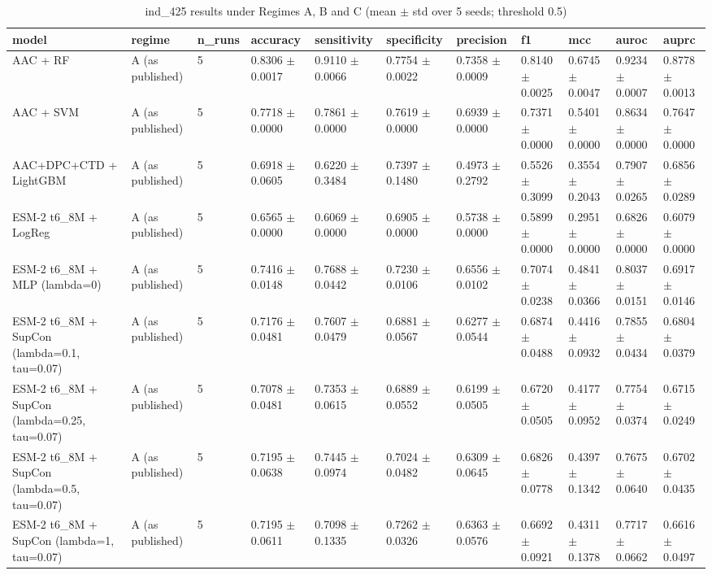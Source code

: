 \begin{table}[ht]
\centering\small
\caption{ind\_425 results under Regimes A, B and C (mean $\pm$ std over 5 seeds; threshold 0.5)}
\label{tab:T5_2_ind425}
\begin{tabular}{lllllllllll}
\hline
model & regime & n\_runs & accuracy & sensitivity & specificity & precision & f1 & mcc & auroc & auprc \\
\hline
AAC + RF & A (as published) & 5 & 0.8306 $\pm$ 0.0017 & 0.9110 $\pm$ 0.0066 & 0.7754 $\pm$ 0.0022 & 0.7358 $\pm$ 0.0009 & 0.8140 $\pm$ 0.0025 & 0.6745 $\pm$ 0.0047 & 0.9234 $\pm$ 0.0007 & 0.8778 $\pm$ 0.0013 \\
AAC + SVM & A (as published) & 5 & 0.7718 $\pm$ 0.0000 & 0.7861 $\pm$ 0.0000 & 0.7619 $\pm$ 0.0000 & 0.6939 $\pm$ 0.0000 & 0.7371 $\pm$ 0.0000 & 0.5401 $\pm$ 0.0000 & 0.8634 $\pm$ 0.0000 & 0.7647 $\pm$ 0.0000 \\
AAC+DPC+CTD + LightGBM & A (as published) & 5 & 0.6918 $\pm$ 0.0605 & 0.6220 $\pm$ 0.3484 & 0.7397 $\pm$ 0.1480 & 0.4973 $\pm$ 0.2792 & 0.5526 $\pm$ 0.3099 & 0.3554 $\pm$ 0.2043 & 0.7907 $\pm$ 0.0265 & 0.6856 $\pm$ 0.0289 \\
ESM-2 t6\_8M + LogReg & A (as published) & 5 & 0.6565 $\pm$ 0.0000 & 0.6069 $\pm$ 0.0000 & 0.6905 $\pm$ 0.0000 & 0.5738 $\pm$ 0.0000 & 0.5899 $\pm$ 0.0000 & 0.2951 $\pm$ 0.0000 & 0.6826 $\pm$ 0.0000 & 0.6079 $\pm$ 0.0000 \\
ESM-2 t6\_8M + MLP (lambda=0) & A (as published) & 5 & 0.7416 $\pm$ 0.0148 & 0.7688 $\pm$ 0.0442 & 0.7230 $\pm$ 0.0106 & 0.6556 $\pm$ 0.0102 & 0.7074 $\pm$ 0.0238 & 0.4841 $\pm$ 0.0366 & 0.8037 $\pm$ 0.0151 & 0.6917 $\pm$ 0.0146 \\
ESM-2 t6\_8M + SupCon (lambda=0.1, tau=0.07) & A (as published) & 5 & 0.7176 $\pm$ 0.0481 & 0.7607 $\pm$ 0.0479 & 0.6881 $\pm$ 0.0567 & 0.6277 $\pm$ 0.0544 & 0.6874 $\pm$ 0.0488 & 0.4416 $\pm$ 0.0932 & 0.7855 $\pm$ 0.0434 & 0.6804 $\pm$ 0.0379 \\
ESM-2 t6\_8M + SupCon (lambda=0.25, tau=0.07) & A (as published) & 5 & 0.7078 $\pm$ 0.0481 & 0.7353 $\pm$ 0.0615 & 0.6889 $\pm$ 0.0552 & 0.6199 $\pm$ 0.0505 & 0.6720 $\pm$ 0.0505 & 0.4177 $\pm$ 0.0952 & 0.7754 $\pm$ 0.0374 & 0.6715 $\pm$ 0.0249 \\
ESM-2 t6\_8M + SupCon (lambda=0.5, tau=0.07) & A (as published) & 5 & 0.7195 $\pm$ 0.0638 & 0.7445 $\pm$ 0.0974 & 0.7024 $\pm$ 0.0482 & 0.6309 $\pm$ 0.0645 & 0.6826 $\pm$ 0.0778 & 0.4397 $\pm$ 0.1342 & 0.7675 $\pm$ 0.0640 & 0.6702 $\pm$ 0.0435 \\
ESM-2 t6\_8M + SupCon (lambda=1, tau=0.07) & A (as published) & 5 & 0.7195 $\pm$ 0.0611 & 0.7098 $\pm$ 0.1335 & 0.7262 $\pm$ 0.0326 & 0.6363 $\pm$ 0.0576 & 0.6692 $\pm$ 0.0921 & 0.4311 $\pm$ 0.1378 & 0.7717 $\pm$ 0.0662 & 0.6616 $\pm$ 0.0497 \\

\end{tabular}
\end{table}
